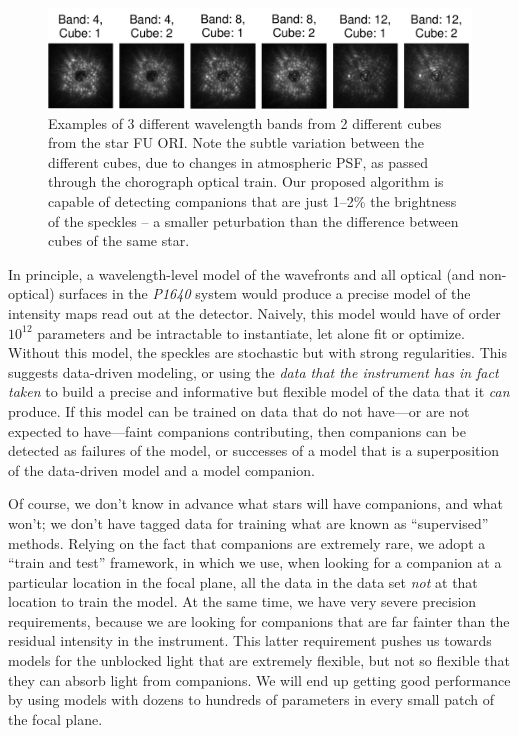 \documentclass[12pt,pdftex,preprint]{aastex}
\newcommand{\project}[1]{\textsl{#1}}
\begin{document}
\begin{figure}[h!]
\begin{center}
\includegraphics[width=6in]{figs/examples.pdf}
\end{center}
\vspace{-7mm}
\caption{Examples of 3 different wavelength bands from 2 different
 cubes from the star FU ORI. Note the subtle variation between the
 different cubes, due to changes in atmospheric PSF, as passed
 through the chorograph optical train. Our proposed algorithm is
 capable of detecting companions that are just 1--2\% the brightness
 of the speckles -- a smaller peturbation than the difference between
 cubes of the same star.}
\label{fig:examples}
\end{figure}

In principle, a wavelength-level model of the wavefronts and all
optical (and non-optical) surfaces in the \project{P1640} system would
produce a precise model of the intensity maps read out at the
detector.  Naively, this model would have of order $10^{12}$
parameters and be intractable to instantiate, let alone fit or
optimize.  Without this model, the speckles are stochastic but with
strong regularities.  This suggests data-driven modeling, or using the
\emph{data that the instrument has in fact taken} to build a precise
and informative but flexible model of the data that it \emph{can}
produce.  If this model can be trained on data that do not have---or
are not expected to have---faint companions contributing, then
companions can be detected as failures of the model, or successes of a
model that is a superposition of the data-driven model and a model
companion.

Of course, we don't know in advance what stars will have companions,
and what won't; we don't have tagged data for training what are known
as ``supervised'' methods.  Relying on the fact that companions are
extremely rare, we adopt a ``train and test'' framework, in which we
use, when looking for a companion at a particular location in the
focal plane, all the data in the data set \emph{not} at that location
to train the model.  At the same time, we have very severe precision
requirements, because we are looking for companions that are far
fainter than the residual intensity in the instrument.  This latter
requirement pushes us towards models for the unblocked light that are
extremely flexible, but not so flexible that they can absorb light
from companions.  We will end up getting good performance by using
models with dozens to hundreds of parameters in every small patch of
the focal plane.
\end{document}
